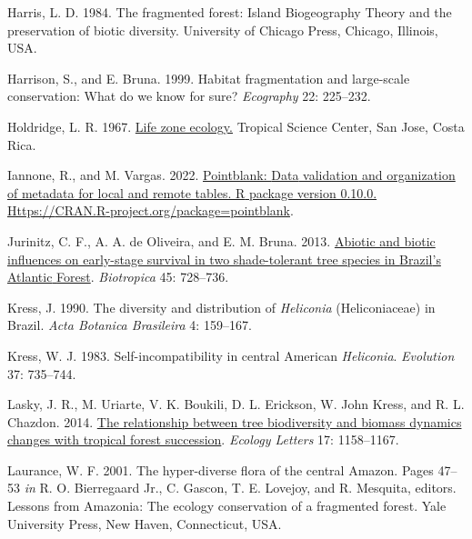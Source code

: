 \documentclass[
  man, donotrepeattitle,floatsintext]{apa6}
\newlength{\cslhangindent}
\newlength{\cslentryspacingunit} %
\newenvironment{CSLReferences}[2] %
 {%
  \setlength{\parindent}{0pt}
  \ifodd #1
  \let\oldpar\par
  \def\par{\hangindent=\cslhangindent\oldpar}
  \fi
  \setlength{\parskip}{#2\cslentryspacingunit}
 }%
 {}
\begin{document}
\begin{CSLReferences}{1}{0}
\leavevmode{}%
Harris, L. D. 1984. The fragmented forest: {Island} {Biogeography} {Theory} and the preservation of biotic diversity. University of Chicago Press, Chicago, Illinois, USA.

\leavevmode{}%
Harrison, S., and E. Bruna. 1999. Habitat fragmentation and large-scale conservation: What do we know for sure? \emph{Ecography} 22: 225--232.

\leavevmode{}%
Holdridge, L. R. 1967. \href{https://www.cabdirect.org/cabdirect/abstract/19670604180}{Life zone ecology.} Tropical Science Center, San Jose, Costa Rica.

\leavevmode{}%
Iannone, R., and M. Vargas. 2022. \href{https://CRAN.R-project.org/package=pointblank}{Pointblank: {Data} validation and organization of metadata for local and remote tables. {R} package version 0.10.0. Https://{CRAN}.{R}-project.org/package=pointblank}.

\leavevmode{}%
Jurinitz, C. F., A. A. de Oliveira, and E. M. Bruna. 2013. \href{https://doi.org/10.1111/btp.12058}{Abiotic and biotic influences on early-stage survival in two shade-tolerant tree species in {Brazil}'s {Atlantic} {Forest}}. \emph{Biotropica} 45: 728--736.

\leavevmode{}%
Kress, J. 1990. The diversity and distribution of \emph{{Heliconia}} ({Heliconiaceae}) in {Brazil}. \emph{Acta Botanica Brasileira} 4: 159--167.

\leavevmode{}%
Kress, W. J. 1983. Self-incompatibility in central {American} \emph{{Heliconia}}. \emph{Evolution} 37: 735--744.

\leavevmode{}%
Lasky, J. R., M. Uriarte, V. K. Boukili, D. L. Erickson, W. John Kress, and R. L. Chazdon. 2014. \href{https://doi.org/10.1111/ele.12322}{The relationship between tree biodiversity and biomass dynamics changes with tropical forest succession}. \emph{Ecology Letters} 17: 1158--1167.

\leavevmode{}%
Laurance, W. F. 2001. The hyper-diverse flora of the central {Amazon}. Pages 47--53 \emph{in} R. O. Bierregaard Jr., C. Gascon, T. E. Lovejoy, and R. Mesquita, editors. Lessons from {Amazonia}: {The} ecology conservation of a fragmented forest. Yale University Press, New Haven, Connecticut, USA.


\end{CSLReferences}
\end{document}
